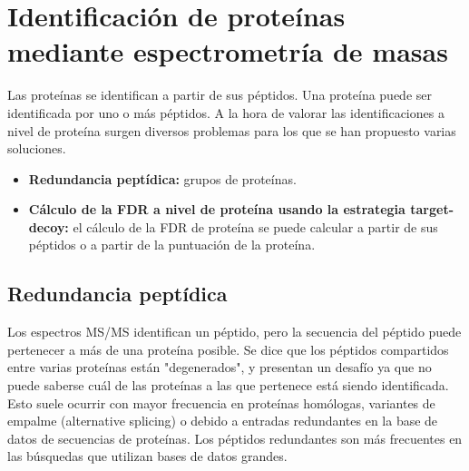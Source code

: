 \chapter{Identificación de proteínas mediante espectrometría de masas}
Las proteínas se identifican a partir de sus péptidos. Una proteína puede ser identificada por uno o más péptidos. A la hora de valorar las identificaciones a nivel de proteína surgen diversos problemas para los que se han propuesto varias soluciones.
\begin{itemize}
\item \textbf{Redundancia peptídica:} grupos de proteínas.
\item \textbf{Cálculo de la FDR a nivel de proteína usando la estrategia target-decoy:} el cálculo de la FDR de proteína se puede calcular a partir de sus péptidos o a partir de la puntuación de la proteína.
\end{itemize}

\section{Redundancia peptídica}
Los espectros MS/MS identifican un péptido, pero la secuencia del péptido puede pertenecer a más de una proteína posible. Se dice que los péptidos compartidos entre varias proteínas están "degenerados", y presentan un desafío ya que no puede saberse cuál de las proteínas a las que pertenece está siendo identificada. Esto suele ocurrir con mayor frecuencia en proteínas homólogas, variantes de empalme (alternative splicing) o debido a entradas redundantes en la base de datos de secuencias de proteínas. Los péptidos redundantes son más frecuentes en las búsquedas que utilizan bases de datos grandes.

